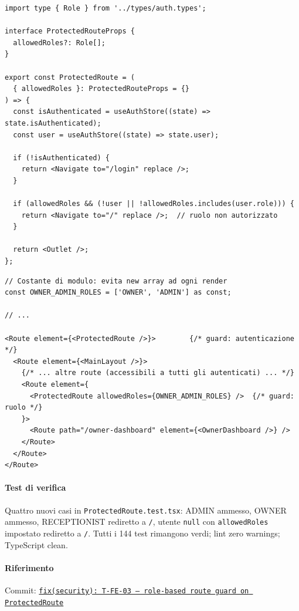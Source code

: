 ﻿\documentclass[a4paper,12pt]{report}
\newcommand{\commitref}[2]{\texttt{\small \href{https://github.com/diegoandruccioli/hotel-pms/commit/#1}{#2}}}
\begin{document}
\begin{securebox}[title={ProtectedRoute.tsx --- con prop allowedRoles (T-FE-03)}]
\begin{lstlisting}[style=typescript]
import type { Role } from '../types/auth.types';

interface ProtectedRouteProps {
  allowedRoles?: Role[];
}

export const ProtectedRoute = (
  { allowedRoles }: ProtectedRouteProps = {}
) => {
  const isAuthenticated = useAuthStore((state) => state.isAuthenticated);
  const user = useAuthStore((state) => state.user);

  if (!isAuthenticated) {
    return <Navigate to="/login" replace />;
  }

  if (allowedRoles && (!user || !allowedRoles.includes(user.role))) {
    return <Navigate to="/" replace />;  // ruolo non autorizzato
  }

  return <Outlet />;
};
\end{lstlisting}
\end{securebox}

\begin{securebox}[title={App.tsx --- /owner-dashboard con doppio guard (T-FE-03)}]
\begin{lstlisting}[style=typescript]
// Costante di modulo: evita new array ad ogni render
const OWNER_ADMIN_ROLES = ['OWNER', 'ADMIN'] as const;

// ...

<Route element={<ProtectedRoute />}>        {/* guard: autenticazione */}
  <Route element={<MainLayout />}>
    {/* ... altre route (accessibili a tutti gli autenticati) ... */}
    <Route element={
      <ProtectedRoute allowedRoles={OWNER_ADMIN_ROLES} />  {/* guard: ruolo */}
    }>
      <Route path="/owner-dashboard" element={<OwnerDashboard />} />
    </Route>
  </Route>
</Route>
\end{lstlisting}
\end{securebox}

\paragraph{Test di verifica}
Quattro nuovi casi in \texttt{ProtectedRoute.test.tsx}: ADMIN ammesso, OWNER ammesso,
RECEPTIONIST rediretto a \texttt{/}, utente \texttt{null} con \texttt{allowedRoles} impostato
rediretto a \texttt{/}. Tutti i 144 test rimangono verdi; lint zero warnings; TypeScript clean.

\paragraph{Riferimento} Commit: \commitref{ccfa431}{fix(security): T-FE-03 --- role-based route guard on ProtectedRoute}
\end{document}

